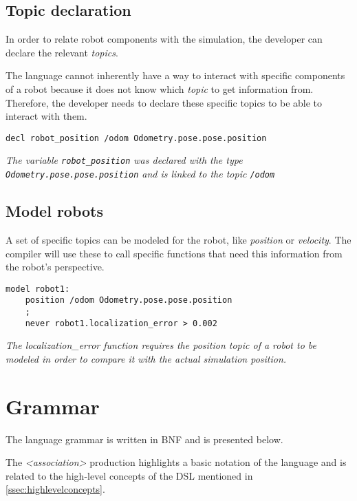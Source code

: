 \subsection{Topic declaration}
\label{ssec:declarations}

In order to relate robot components with the simulation, the developer can declare the relevant \textit{topics}.

The language cannot inherently have a way to interact with specific components of a robot because it does not know which \textit{topic} to get information from. Therefore, the developer needs to declare these specific topics to be able to interact with them.

\begin{lstlisting}
decl robot_position /odom Odometry.pose.pose.position	
\end{lstlisting}
\textit{The variable \texttt{robot\_position} was declared with the type \texttt{Odometry.pose.pose.position} and is linked to the topic \texttt{/odom}}


\subsection{Model robots}
\label{ssec:models}

A set of specific topics can be modeled for the robot, like \textit{position} or \textit{velocity}. The compiler will use these to call specific functions that need this information from the robot's perspective.

\begin{lstlisting}
model robot1:
    position /odom Odometry.pose.pose.position
    ;
    never robot1.localization_error > 0.002
\end{lstlisting}

\textit{The localization\_error function requires the position topic of a robot to be modeled in order to compare it with the actual simulation position.}

\section{Grammar}
\label{sec:grammar}

The language grammar is written in BNF and is presented below.

The \textit{<association>} production highlights a basic notation of the language and is related to the high-level concepts of the DSL mentioned in \autoref{ssec:highlevelconcepts}.

